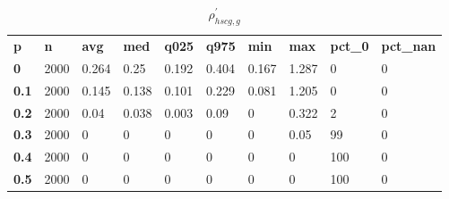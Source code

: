 \begin{table}[h]
 \centering 
\footnotesize
\caption{$\rho_{hscg,g}^\prime $}
\label{tab:alphahscgg}
\begin{tabular}[h]{| l l l l l l l l l l|
    } \hline
\textbf{ p} & \textbf{ n} & \textbf{ avg} & \textbf{ med} & \textbf{ q025} & \textbf{ q975} & \textbf{ min} & \textbf{ max} & \textbf{ pct\_0} & \textbf{ pct\_nan}
           \\
  \textbf{  0} & 2000 & 0.264 &  0.25 & 0.192 & 0.404 & 0.167 & 1.287 &   0 & 0
           \\
  \textbf{0.1} & 2000 & 0.145 & 0.138 & 0.101 & 0.229 & 0.081 & 1.205 &   0 & 0
           \\
  \textbf{0.2} & 2000 &  0.04 & 0.038 & 0.003 &  0.09 &     0 & 0.322 &   2 & 0
           \\
  \textbf{0.3} & 2000 &     0 &     0 &     0 &     0 &     0 &  0.05 &  99 & 0
           \\
  \textbf{0.4} & 2000 &     0 &     0 &     0 &     0 &     0 &     0 & 100 & 0
           \\
  \textbf{0.5} & 2000 &     0 &     0 &     0 &     0 &     0 &     0 & 100 & 0
           \\
 \hline \end{tabular}
 \end{table}
